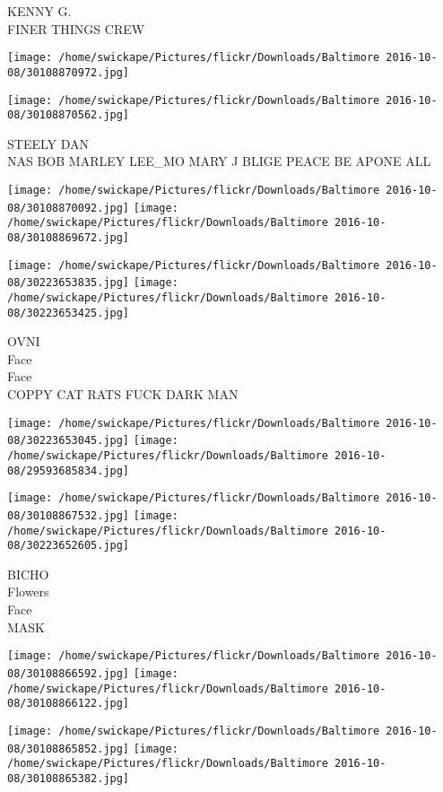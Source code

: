 \documentclass[10pt,letterpaper]{article}
\begin{document}
KENNY G.\\
FINER THINGS CREW
\pagebreak

\texttt{[image: /home/swickape/Pictures/flickr/Downloads/Baltimore 2016-10-08/30108870972.jpg]}

\vspace{0.25in}
\texttt{[image: /home/swickape/Pictures/flickr/Downloads/Baltimore 2016-10-08/30108870562.jpg]}

STEELY DAN\\
NAS BOB MARLEY LEE\_MO MARY J BLIGE PEACE BE APONE ALL
\pagebreak

\texttt{[image: /home/swickape/Pictures/flickr/Downloads/Baltimore 2016-10-08/30108870092.jpg]}
\texttt{[image: /home/swickape/Pictures/flickr/Downloads/Baltimore 2016-10-08/30108869672.jpg]}

\texttt{[image: /home/swickape/Pictures/flickr/Downloads/Baltimore 2016-10-08/30223653835.jpg]}
\texttt{[image: /home/swickape/Pictures/flickr/Downloads/Baltimore 2016-10-08/30223653425.jpg]}

OVNI\\
Face\\
Face\\
COPPY CAT RATS FUCK DARK MAN
\pagebreak

\texttt{[image: /home/swickape/Pictures/flickr/Downloads/Baltimore 2016-10-08/30223653045.jpg]}
\texttt{[image: /home/swickape/Pictures/flickr/Downloads/Baltimore 2016-10-08/29593685834.jpg]}

\texttt{[image: /home/swickape/Pictures/flickr/Downloads/Baltimore 2016-10-08/30108867532.jpg]}
\texttt{[image: /home/swickape/Pictures/flickr/Downloads/Baltimore 2016-10-08/30223652605.jpg]}

BICHO\\
Flowers\\
Face\\
MASK
\pagebreak

\texttt{[image: /home/swickape/Pictures/flickr/Downloads/Baltimore 2016-10-08/30108866592.jpg]}
\texttt{[image: /home/swickape/Pictures/flickr/Downloads/Baltimore 2016-10-08/30108866122.jpg]}

\texttt{[image: /home/swickape/Pictures/flickr/Downloads/Baltimore 2016-10-08/30108865852.jpg]}
\texttt{[image: /home/swickape/Pictures/flickr/Downloads/Baltimore 2016-10-08/30108865382.jpg]}
\end{document}
